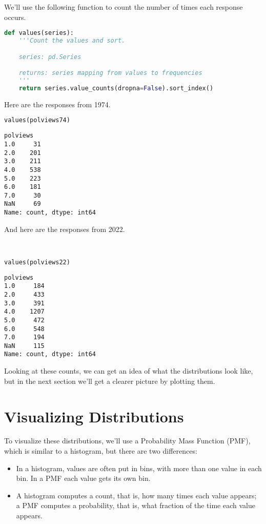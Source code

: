 We'll use the following function to count the number of times each
response occurs.

\begin{lstlisting}[language=Python,style=source]
def values(series):
    '''Count the values and sort.

    series: pd.Series

    returns: series mapping from values to frequencies
    '''
    return series.value_counts(dropna=False).sort_index()
\end{lstlisting}

Here are the responses from 1974.

\begin{lstlisting}[language=Python,style=source]
values(polviews74)
\end{lstlisting}

\begin{lstlisting}[style=output]
polviews
1.0     31
2.0    201
3.0    211
4.0    538
5.0    223
6.0    181
7.0     30
NaN     69
Name: count, dtype: int64
\end{lstlisting}

And here are the responses from 2022.

\begin{lstlisting}[language=Python,style=source]


values(polviews22)
\end{lstlisting}

\begin{lstlisting}[style=output]
polviews
1.0     184
2.0     433
3.0     391
4.0    1207
5.0     472
6.0     548
7.0     194
NaN     115
Name: count, dtype: int64
\end{lstlisting}

Looking at these counts, we can get an idea of what the distributions
look like, but in the next section we'll get a clearer picture by
plotting them.

\section{Visualizing Distributions}\label{visualizing-distributions}

To visualize these distributions, we'll use a Probability Mass Function
(PMF), which is similar to a histogram, but there are two differences:

\begin{itemize}
\item
  In a histogram, values are often put in bins, with more than one value
  in each bin. In a PMF each value gets its own bin.
\item
  A histogram computes a count, that is, how many times each value
  appears; a PMF computes a probability, that is, what fraction of the
  time each value appears.
\end{itemize}

